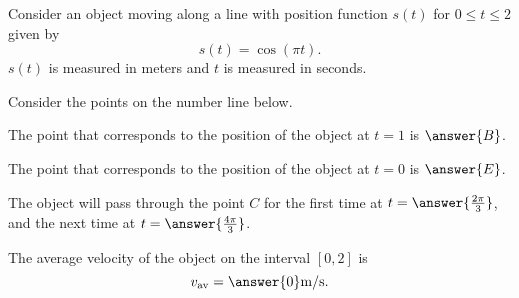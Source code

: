\documentclass{ximera}
\author{Nela Lakos \and Kyle Parsons}
\begin{document}
\begin{exercise}

Consider an object moving along a line with position function $s(t)$ for $0\leq t\leq2$ given by
\[
s(t) = \cos(\pi t).
\]
$s(t)$ is measured in meters and $t$ is measured in seconds.

Consider the points on the number line below.

\begin{exercise}
The point that corresponds to the position of the object at $t=1$ is $\answer{B}$.\\
\begin{exercise}
The point that corresponds to the position of the object at $t=0$ is $\answer{E}$.
\begin{exercise}
The object will pass through  the point $C$ for the first time at $t=\answer{\frac{2\pi}{3}}$, and the next time at $t=\answer{\frac{4\pi}{3}}$.
\begin{exercise}

The average velocity of the object on the interval $[0,2]$ is
\[
v_{\text{av}} = \answer{0}\text{m/s.}
\]
\end{exercise}
\end{exercise}

\end{exercise}
\end{exercise}
\end{exercise}
\end{document}
